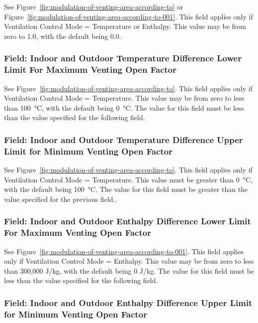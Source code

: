 See Figure~\ref{fig:modulation-of-venting-area-according-to} or Figure~\ref{fig:modulation-of-venting-area-according-to-001}. This field applies only if Ventilation Control Mode = Temperature or Enthalpy. This value may be from zero to 1.0, with the default being 0.0.

\subsubsection{Field: Indoor and Outdoor Temperature Difference Lower Limit For Maximum Venting Open Factor}\label{field-indoor-and-outdoor-temperature-difference-lower-limit-for-maximum-venting-open-factor}

See Figure~\ref{fig:modulation-of-venting-area-according-to}. This field applies only if Ventilation Control Mode = Temperature. This value may be from zero to less than \SI{100}{\celsius}, with the default being \SI{0}{\celsius}. The value for this field must be less than the value specified for the following field.

\subsubsection{Field: Indoor and Outdoor Temperature Difference Upper Limit for Minimum Venting Open Factor}\label{field-indoor-and-outdoor-temperature-difference-upper-limit-for-minimum-venting-open-factor}

See Figure~\ref{fig:modulation-of-venting-area-according-to}. This field applies only if Ventilation Control Mode = Temperature. This value must be greater than \SI{0}{\celsius}, with the default being \SI{100}{\celsius}. The value for this field must be greater than the value specified for the previous field..

\subsubsection{Field: Indoor and Outdoor Enthalpy Difference Lower Limit For Maximum Venting Open Factor}\label{field-indoor-and-outdoor-enthalpy-difference-lower-limit-for-maximum-venting-open-factor}

See Figure~\ref{fig:modulation-of-venting-area-according-to-001}. This field applies only if Ventilation Control Mode = Enthalpy. This value may be from zero to less than 300,000 J/kg, with the default being 0 J/kg. The value for this field must be less than the value specified for the following field.

\subsubsection{Field: Indoor and Outdoor Enthalpy Difference Upper Limit for Minimum Venting Open Factor}\label{field-indoor-and-outdoor-enthalpy-difference-upper-limit-for-minimum-venting-open-factor}

